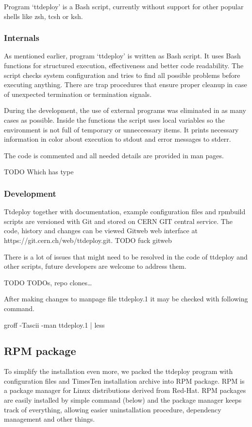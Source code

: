 \documentclass[11pt, letterpaper]{article}            %
\begin{document}
Program ‘ttdeploy’ is a Bash script, currently without support for other popular shells like zsh, tcsh or ksh.

\subsubsection{Internals}

As mentioned earlier, program ‘ttdeploy’ is written as Bash script. It uses Bash functions for structured execution, effectiveness and better code readability. The script checks system configuration and tries to find all possible problems before executing anything. There are trap procedures that ensure proper cleanup in case of unexpected termination or termination signals.

During the development, the use of external programs was eliminated in as many cases as possible. Inside the functions the script uses local variables so the environment is not full of temporary or unneccessary items. It prints necessary information in color about execution to stdout and error messages to stderr.

The code is commented and all needed details are provided in man pages.

TODO Which has type

\subsubsection{Development}

Ttdeploy together with documentation, example configuration files and rpmbuild scripts are versioned with Git and stored on CERN GIT central service.  The code, history and changes can be viewed Gitweb web interface at https://git.cern.ch/web/ttdeploy.git. TODO fuck gitweb

There is a lot of issues that might need to be resolved in the code of ttdeploy and other scripts, future developers are welcome to address them.

TODO TODOs, repo clones…

After making changes to manpage file ttdeploy.1 it may be checked with following command.

                groff -Tascii -man ttdeploy.1 | less

\subsection{RPM package}
To simplify the installation even more, we packed the ttdeploy program with configuration files and TimesTen installation archive into RPM package. RPM is a package manager for Linux distributions derived from Red-Hat. RPM packages are easily installed by simple command (below) and the package manager keeps track of everything, allowing easier uninstallation procedure, dependency management and other things.
\end{document}

